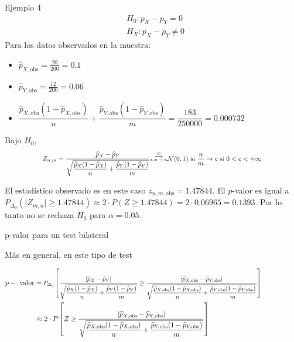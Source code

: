 \documentclass{beamer}
\theoremstyle{definition}
\newcommand\scalemath[2]{\scalebox{#1}{\mbox{\ensuremath{\displaystyle #2}}}}
\begin{document}
\begin{frame}{\color{rosee}Ejemplo 4}
\small
$$
\begin{aligned}
&H_0:  p_X-p_Y=0 \\
&H_X:  p_X-p_Y \neq 0
\end{aligned}
$$
Para los datos observados en la muestra:
\begin{itemize}
    \item  $\widehat{p}_{X,\text{obs}}=\frac{20}{200}=0.1$

\item  $\widehat{p}_{Y,\text{obs}}=\frac{12}{200}=0.06$
\item  $\dfrac{\widehat{p}_{X,\text{obs}}(1-\widehat{p}_{X,\text{obs}})}{n}+\dfrac{\widehat{p}_{Y,\text{obs}}(1-\widehat{p}_{Y,\text{obs}})}{m}=\dfrac{183}{250000}=0.000732$ 

\end{itemize}
Bajo $H_0$,
$$
\begin{aligned}
\scalemath{0.8}{Z_{n,m}=\dfrac{\widehat{p}_X-\widehat{p}_Y}{\sqrt{\dfrac{\widehat{p}_X(1-\widehat{p}_X)}{n}+\dfrac{\widehat{p}_Y(1-\widehat{p}_Y)}{m}}}\overset{\stackrel{D}{\longrightarrow}}{\scalemath{0.6}{n,m\to\infty}} \mathcal{N}(0,1) \text{ si } \frac{n}{m}\to c \text{ si } 0<c<+\infty}
\end{aligned}
$$


El estadístico observado es en este caso $z_{n,m,\text{obs}}=1.47844$. El $p$-valor es igual a $ P_{\Delta_0}(\vert Z_{m,n} \vert \geq 1.47844) \approx 2\cdot P(Z\geq 1.47844)=2 \cdot 0.06965=0.1393$. Por lo tanto no se rechaza $H_0$ para $\alpha=0.05$.

\end{frame}

\begin{frame}{\color{rosee} p-valor para un test bilateral}

M\'as en general, en este tipo de test

\medskip

       $\begin{aligned} \scalemath{0.85}{p-\text { valor }} &\scalemath{0.75}{=P_{\Delta_0}\left[\frac{\left|\widehat{p}_X-\widehat{p}_Y\right|}{\sqrt{\dfrac{\widehat{p}_X(1-\widehat{p}_X)}{n}+
         \dfrac{\widehat{p}_Y(1-\widehat{p}_Y)}{m}}} \geq \frac{\left|\widehat{p}_{X,\text{obs}}-\widehat{p}_{Y,\text{obs}}\right|}{\sqrt{\dfrac{\widehat{p}_{X,\text{obs}}(1-\widehat{p}_{X,\text{obs}})}{n}+
         \dfrac{\widehat{p}_{Y,\text{obs}}(1-\widehat{p}_{Y,\text{obs}})}{m}}}\right]} \\ &\scalemath{0.85}{\approx 2 \cdot P\left[Z\geq \frac{\left|\widehat{p}_{X,\text{obs}}-\widehat{p}_{Y,\text{obs}}\right|}{\sqrt{\dfrac{\widehat{p}_{X,\text{obs}}(1-\widehat{p}_{X,\text{obs}})}{n}+
         \dfrac{\widehat{p}_{Y,\text{obs}}(1-\widehat{p}_{Y,\text{obs}})}{m}}}\right]} \end{aligned}$
\end{frame}
\end{document}
